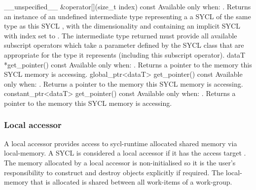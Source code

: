   \addRow
    { \__unspecified__ \&operator[](size_t index) const }
    {
      Available only when: .
      \newline
      Returns an instance of an undefined intermediate type representing a
      a SYCL  of the same type as this SYCL , with the dimensionality  and
      containing an implicit SYCL  with index  set to . The intermediate type returned
      must provide all available subscript operators which take a  parameter defined by the SYCL  class that
      are appropriate for the type it represents (including this subscript
      operator).
    }
  \addRow
    { dataT *get_pointer() const}
    {
      Available only when: .
      Returns a pointer to the memory this SYCL  memory is
      accessing.
    }
  \addRow
    { global_ptr<dataT> get_pointer() const}
    {
      Available only when: .
      Returns a pointer to the memory this SYCL  memory is
      accessing.
    }
  \addRow
    { constant_ptr<dataT> get_pointer() const}
    {
      Available only when: .
      Returns a pointer to the memory this SYCL  memory is
      accessing.
    }
\completeTable


\subsubsection{Local accessor}
\label{sub.section.accessors.local}

A local accessor provides access to \gls{sycl-runtime} allocated shared memory via
\gls{local-memory}. A SYCL  is considered a local accessor
if it has the access target .
The memory allocated by a local accessor is non-initialised
so it is the user's responsibility to construct and destroy objects explicitly
if required. The \gls{local-memory} that is allocated is shared between
all \glspl{work-item} of a \gls{work-group}.

